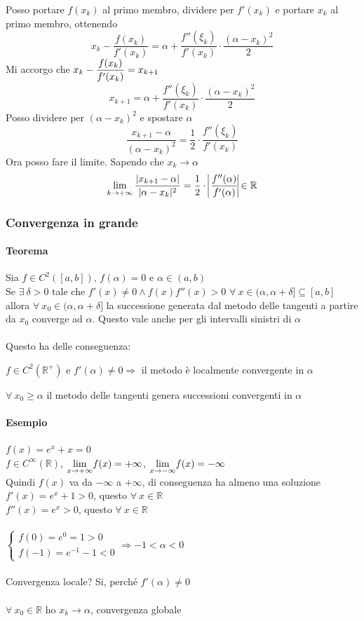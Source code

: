 \documentclass[10pt]{book}
\begin{document}
Posso portare $f(x_k)$ al primo membro, dividere per $f'(x_k)$ e portare $x_k$ al primo membro, ottenendo
$$x_k - \frac{f(x_k)}{f'(x_k)} = \alpha + \frac{f''(\xi_k)}{f'(x_k)}\cdot\frac{(\alpha - x_k)^2}{2}$$
Mi accorgo che $\mathlarger{x_k - \frac{f(x_k)}{f'(x_k)} = x_{k+1}}$
$$x_{k+1} = \alpha + \frac{f''(\xi_k)}{f'(x_k)}\cdot\frac{(\alpha - x_k)^2}{2}$$
Posso dividere per $(\alpha - x_k)^2$ e spostare $\alpha$
$$\frac{x_{k+1} - \alpha}{(\alpha - x_k)^2} = \frac{1}{2}\cdot\frac{f''(\xi_k)}{f'(x_k)}$$
Ora posso fare il limite. Sapendo che $x_k \rightarrow \alpha$
$$\lim_{k\to+\infty}\frac{|x_{k+1} - \alpha|}{|\alpha - x_k|^2} = \frac{1}{2}\cdot\:\vline\frac{f''(\alpha)}{f'(\alpha)}\vline \in \mathbb{R}$$
\subsubsection{Convergenza in grande}
\paragraph{Teorema} Sia $f\in C^2([a, b])$, $f(\alpha) = 0$ e $\alpha \in (a, b)$\\
Se $\exists\:\delta > 0$ tale che $f'(x) \neq 0 \wedge f(x)f''(x) > 0$ $\forall\:x \in(\alpha, \alpha + \delta]\subseteq[a, b]$ allora $\forall\:x_0\in(\alpha, \alpha + \delta]$ la successione generata dal metodo delle tangenti a partire da $x_0$ converge ad $\alpha$. Questo vale anche per gli intervalli sinistri di $\alpha$\\\\
Questo ha delle conseguenza:
\begin{list}{}{}
	\item $f\in C^2(\mathbb{R}^+)$ e $f'(\alpha) \neq 0 \Rightarrow$ il metodo è localmente convergente in $\alpha$
	\item $\forall\:x_0 \geq \alpha$ il metodo delle tangenti genera successioni convergenti in $\alpha$
\end{list}
\pagebreak
\paragraph{Esempio} $f(x) = e^x + x = 0$\\
$f\in C^\infty(\mathbb{R})$, $\mathlarger{\lim_{x\to+\infty}} f(x) = +\infty$, $\mathlarger{\lim_{x\to-\infty}} f(x) = -\infty$\\
Quindi $f(x)$ va da $-\infty$ a $+\infty$, di conseguenza ha almeno una soluzione\\
$f'(x) = e^x + 1 > 0$, questo $\forall\:x \in\mathbb{R}$\\
$f''(x) = e^x > 0$, questo $\forall\:x \in\mathbb{R}$\\\\
$\left\{\begin{array}{l}
f(0) = e^0 = 1 > 0\\f(-1) = e^{-1} - 1 < 0
\end{array}\right.\Rightarrow -1 < \alpha < 0$\\\\
Convergenza locale? Si, perché $f'(\alpha) \neq 0$\\\\
$\forall\:x_0\in\mathbb{R}$ ho $x_k \rightarrow \alpha$, convergenza globale
\end{document}
